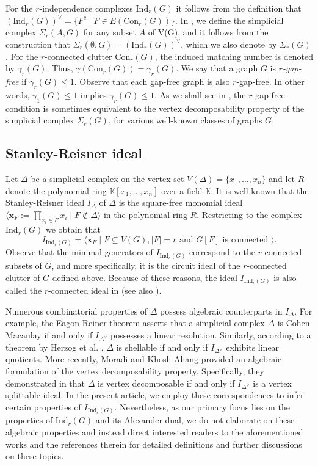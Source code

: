 \documentclass[12pt,reqno]{amsart}
\theoremstyle{definition}
\newcommand{\Con}{{\mathrm{Con}}}
\def\l{\langle}
\def\r{\rangle}
\def\x{\mathbf x}
\def\SrAG{\Sigma_r(A,G)}
\def\Indr{\mathrm{Ind}_r(G)}
\begin{document}
For the $r$-independence complexes $\Indr$ it follows from the definition that $(\Indr)^{\vee}=\{F^c\mid F\in E(\Con_r(G))\}$. In , we define the simplicial complex $\SrAG$ for any subset $A$ of V(G), and it follows from the construction that $\Sigma_{r}(\emptyset, G)=(\Indr)^{\vee}$, which we also denote by $\Sigma_{r}(G)$. For the $r$-connected clutter $\Con_r(G)$, the induced matching number is denoted by $\gamma_r(G)$. Thus, $\gamma(\Con_r(G))=\gamma_r(G)$.  We say that a graph $G$ is {\it $r$-gap-free} if $\gamma_r(G)\le 1$. Observe that each gap-free graph is also $r$-gap-free. In other words, $\gamma_1(G)\le 1$ implies $\gamma_r(G)\le 1$. As we shall see in , the $r$-gap-free condition is sometimes equivalent to the vertex decomposability property of the simplicial complex $\Sigma_{r}(G)$, for various well-known classes of graphs $G$.
	
\subsection{Stanley-Reisner ideal} Let $\Delta$ be a simplicial complex on the vertex set $V(\Delta)=\{x_1,\ldots,x_n\}$ and let $R$ denote the polynomial ring $\mathbb K[x_1,\ldots,x_n]$ over a field $\mathbb K$. 
It is well-known that the Stanley-Reisner ideal $I_{\Delta}$ of $\Delta$ is the square-free monomial ideal $\l\x_{F}:=\prod_{x_i\in F}x_i\mid F\notin\Delta\r$ in the polynomial ring $R$. 
Restricting to the complex $\Indr$ we obtain that 
\[
	I_{\Indr}=\l\x_{F}\mid F\subseteq V(G), |F|=r\text{ and }G[F] \text{ is connected }\r.
\]
Observe that the minimal generators of $I_{\Indr}$ correspond to the $r$-connected subsets of $G$, and more specifically, it is the circuit ideal of the $r$-connected clutter of $G$ defined above. 
Because of these reasons, the ideal $I_{\Indr}$ is also called the $r$-connected ideal in \cite{LQCG} (see also \cite{2025connectedideals}).
	
Numerous combinatorial properties of $\Delta$ possess algebraic counterparts in $I_{\Delta}$. 
For example, the Eagon-Reiner theorem \cite[Theorem 3]{EagonReiner1998} asserts that a simplicial complex $\Delta$ is Cohen-Macaulay if and only if $I_{\Delta^{\vee}}$ possesses a linear resolution. 
Similarly, according to a theorem by Herzog et al. \cite[Theorem 1.4]{HerzogHibiZheng2004}, $\Delta$ is shellable if and only if $I_{\Delta^{\vee}}$ exhibits linear quotients. 
More recently, Moradi and Khosh-Ahang provided an algebraic formulation of the vertex decomposability property. 
Specifically, they demonstrated in \cite[Theorem 2.3]{MoradiAhang2016} that $\Delta$ is vertex decomposable if and only if $I_{\Delta^{\vee}}$ is a vertex splittable ideal. 
In the present article, we employ these correspondences to infer certain properties of $I_{\Indr}$.
Nevertheless, as our primary focus lies on the properties of $\Indr$ and its Alexander dual, we do not elaborate on these algebraic properties and instead direct interested readers to the aforementioned works and the references therein for detailed definitions and further discussions on these topics.
\end{document}

